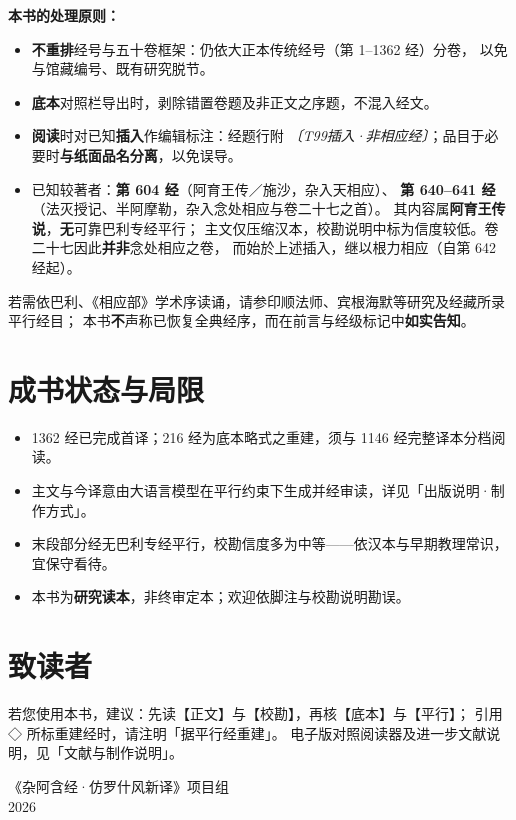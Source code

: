 \textbf{本书的处理原则：}
\begin{itemize}
  \item \textbf{不重排}经号与五十卷框架：仍依大正本传统经号（第 1--1362 经）分卷，
    以免与馆藏编号、既有研究脱节。
  \item \textbf{底本}对照栏导出时，剥除错置卷题及非正文之序题，不混入经文。
  \item \textbf{阅读}时对已知\textbf{插入}作编辑标注：经题行附
    \textit{〔T99插入·非相应经〕}；品目于必要时\textbf{与纸面品名分离}，以免误导。
  \item 已知较著者：\textbf{第 604 经}（阿育王传／施沙，杂入天相应）、
    \textbf{第 640--641 经}（法灭授记、半阿摩勒，杂入念处相应与卷二十七之首）。
    其内容属\textbf{阿育王传说}，\textbf{无}可靠巴利专经平行；
    主文仅压缩汉本，校勘说明中标为信度较低。卷二十七因此\textbf{并非}念处相应之卷，
    而始於上述插入，继以根力相应（自第 642 经起）。
\end{itemize}

\noindent 若需依巴利、《相应部》学术序读诵，请参印顺法师、宾根海默等研究及经藏所录平行经目；
本书\textbf{不}声称已恢复全典经序，而在前言与经级标记中\textbf{如实告知}。

\section*{成书状态与局限}

\begin{itemize}
  \item 1362 经已完成首译；216 经为底本略式之重建，须与 1146 经完整译本分档阅读。
  \item 主文与今译意由大语言模型在平行约束下生成并经审读，详见「出版说明·制作方式」。
  \item 末段部分经无巴利专经平行，校勘信度多为中等——依汉本与早期教理常识，宜保守看待。
  \item 本书为\textbf{研究读本}，非终审定本；欢迎依脚注与校勘说明勘误。
\end{itemize}

\section*{致读者}

若您使用本书，建议：先读【正文】与【校勘】，再核【底本】与【平行】；
引用 ◇ 所标重建经时，请注明「据平行经重建」。
电子版对照阅读器及进一步文献说明，见「文献与制作说明」。

\vfill
\begin{flushright}
《杂阿含经·仿罗什风新译》项目组\\
2026
\end{flushright}

\clearpage
